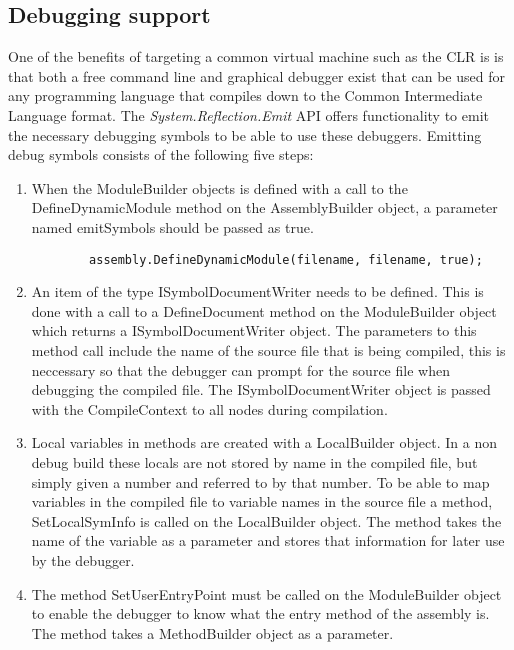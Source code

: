 \subsection{Debugging support}
	
	One of the benefits of targeting a common virtual machine such as the CLR is
	is that both a free command line and graphical debugger exist that can be used
	for any programming language that compiles down to the Common Intermediate
	Language format. The \textit{System.Reflection.Emit} API offers functionality 
	to emit the necessary debugging symbols to be able to use these debuggers.
 	Emitting debug symbols consists of the following five steps:
 	
 	\begin{enumerate}
 		\item When the \textsf{ModuleBuilder} objects is defined with a call to the 
 		\textsf{DefineDynamicModule} method on the \textsf{AssemblyBuilder} object, a
 		parameter named \textsf{emitSymbols} should be passed as \textsf{true}.
 		\begin{verbatim}
 		assembly.DefineDynamicModule(filename, filename, true);
 		\end{verbatim}
 		
		\item An item of the type \textsf{ISymbolDocumentWriter} needs to be defined. 
		This is done with a call to a \textsf{DefineDocument} method on the 
		\textsf{ModuleBuilder} object which returns a \textsf{ISymbolDocumentWriter} 
		object. The parameters to this method call include the name of the source 
		file that is being compiled, this is neccessary so that the debugger can 
		prompt for the source file when debugging the compiled file. The 
		\textsf{ISymbolDocumentWriter} object is passed with the \textsf{CompileContext}
		to all nodes during compilation.

		\item Local variables in methods are created with a \textsf{LocalBuilder} 
		object. In a non debug build these locals are not stored by name in the 
		compiled file, but simply given a number and referred to by that number.
		To be able to map variables in the compiled file to variable names in the
		source file a method, \textsf{SetLocalSymInfo} is called on the 
		\textsf{LocalBuilder} object. The method takes the name of the variable as
		a parameter and stores that information for later use by the debugger.
		
		\item The method \textsf{SetUserEntryPoint} must be called on the 
		\textsf{ModuleBuilder} object to enable the debugger to know what the entry
		method of the assembly is. The method takes a \textsf{MethodBuilder} object
		as a parameter.
		

\end{enumerate}
